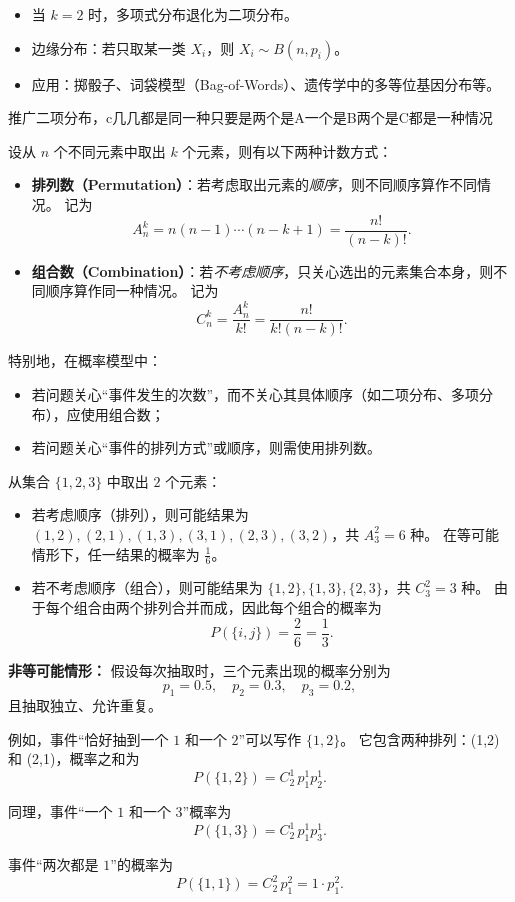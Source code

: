 \begin{remark}
\begin{itemize}
  \item 当 $k=2$ 时，多项式分布退化为二项分布。
  \item 边缘分布：若只取某一类 $X_i$，则 $X_i \sim B(n,p_i)$。
  \item 应用：掷骰子、词袋模型（Bag-of-Words）、遗传学中的多等位基因分布等。
\end{itemize}
\end{remark}
\begin{dxtips}
    推广二项分布，c几几都是同一种只要是两个是A一个是B两个是C都是一种情况
\end{dxtips}
\begin{proposition}[排列和组合的区别]
设从 $n$ 个不同元素中取出 $k$ 个元素，则有以下两种计数方式：
\begin{itemize}
  \item \textbf{排列数（Permutation）}：若考虑取出元素的\emph{顺序}，则不同顺序算作不同情况。  
  记为
  \[
  A_n^k = n (n-1) \cdots (n-k+1) = \frac{n!}{(n-k)!}.
  \]

  \item \textbf{组合数（Combination）}：若\emph{不考虑顺序}，只关心选出的元素集合本身，则不同顺序算作同一种情况。  
  记为
  \[
  C_n^k = \frac{A_n^k}{k!} = \frac{n!}{k!(n-k)!}.
  \]
\end{itemize}

特别地，在概率模型中：
\begin{itemize}
  \item 若问题关心“事件发生的次数”，而不关心其具体顺序（如二项分布、多项分布），应使用组合数；
  \item 若问题关心“事件的排列方式”或顺序，则需使用排列数。
\end{itemize}
\end{proposition}
\begin{example}
从集合 $\{1,2,3\}$ 中取出 $2$ 个元素：

\begin{itemize}
  \item 若考虑顺序（排列），则可能结果为  
  \((1,2),(2,1),(1,3),(3,1),(2,3),(3,2)\)，共 $A_3^2 = 6$ 种。  
  在等可能情形下，任一结果的概率为 $\tfrac{1}{6}$。

  \item 若不考虑顺序（组合），则可能结果为  
  \(\{1,2\}, \{1,3\}, \{2,3\}\)，共 $C_3^2 = 3$ 种。  
  由于每个组合由两个排列合并而成，因此每个组合的概率为
  \[
  P(\{i,j\}) = \frac{2}{6} = \frac{1}{3}.
  \]
\end{itemize}

\textbf{非等可能情形：}  
假设每次抽取时，三个元素出现的概率分别为
\[
p_1=0.5,\quad p_2=0.3,\quad p_3=0.2,
\]
且抽取独立、允许重复。

例如，事件“恰好抽到一个 $1$ 和一个 $2$”可以写作 \(\{1,2\}\)。  
它包含两种排列：(1,2) 和 (2,1)，概率之和为
\[
P(\{1,2\}) = C_2^1 \, p_1^1 p_2^1.
\]

同理，事件“一个 $1$ 和一个 $3$”概率为
\[
P(\{1,3\}) = C_2^1 \, p_1^1 p_3^1.
\]

事件“两次都是 $1$”的概率为
\[
P(\{1,1\}) = C_2^2 \, p_1^2 = 1 \cdot p_1^2.
\]
\end{example}



